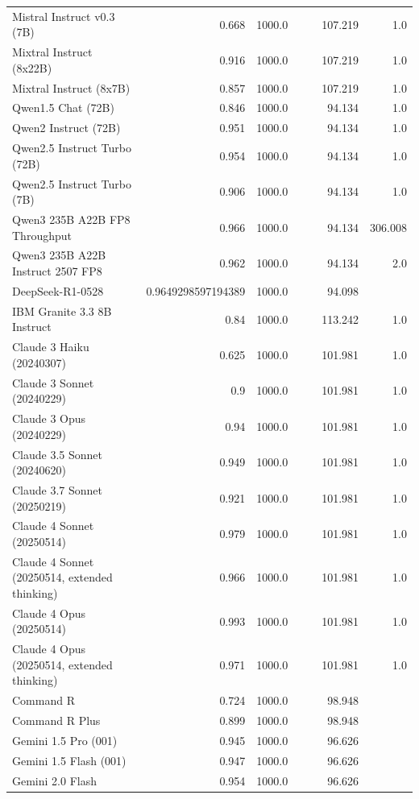 \begin{table}[htp]
{\begin{tabular}{lrrrrrr}
Mistral Instruct v0.3 (7B) & 0.668 & 1000.0 &  &  & 107.219 & 1.0 \\
Mixtral Instruct (8x22B) & 0.916 & 1000.0 &  &  & 107.219 & 1.0 \\
Mixtral Instruct (8x7B) & 0.857 & 1000.0 &  &  & 107.219 & 1.0 \\
Qwen1.5 Chat (72B) & 0.846 & 1000.0 &  &  & 94.134 & 1.0 \\
Qwen2 Instruct (72B) & 0.951 & 1000.0 &  &  & 94.134 & 1.0 \\
Qwen2.5 Instruct Turbo (72B) & 0.954 & 1000.0 &  &  & 94.134 & 1.0 \\
Qwen2.5 Instruct Turbo (7B) & 0.906 & 1000.0 &  &  & 94.134 & 1.0 \\
Qwen3 235B A22B FP8 Throughput & 0.966 & 1000.0 &  &  & 94.134 & 306.008 \\
Qwen3 235B A22B Instruct 2507 FP8 & 0.962 & 1000.0 &  &  & 94.134 & 2.0 \\
DeepSeek-R1-0528 & 0.9649298597194389 & 1000.0 &  &  & 94.098 &  \\
IBM Granite 3.3 8B Instruct & 0.84 & 1000.0 &  &  & 113.242 & 1.0 \\
Claude 3 Haiku (20240307) & 0.625 & 1000.0 &  &  & 101.981 & 1.0 \\
Claude 3 Sonnet (20240229) & 0.9 & 1000.0 &  &  & 101.981 & 1.0 \\
Claude 3 Opus (20240229) & 0.94 & 1000.0 &  &  & 101.981 & 1.0 \\
Claude 3.5 Sonnet (20240620) & 0.949 & 1000.0 &  &  & 101.981 & 1.0 \\
Claude 3.7 Sonnet (20250219) & 0.921 & 1000.0 &  &  & 101.981 & 1.0 \\
Claude 4 Sonnet (20250514) & 0.979 & 1000.0 &  &  & 101.981 & 1.0 \\
Claude 4 Sonnet (20250514, extended thinking) & 0.966 & 1000.0 &  &  & 101.981 & 1.0 \\
Claude 4 Opus (20250514) & 0.993 & 1000.0 &  &  & 101.981 & 1.0 \\
Claude 4 Opus (20250514, extended thinking) & 0.971 & 1000.0 &  &  & 101.981 & 1.0 \\
Command R & 0.724 & 1000.0 &  &  & 98.948 &  \\
Command R Plus & 0.899 & 1000.0 &  &  & 98.948 &  \\
Gemini 1.5 Pro (001) & 0.945 & 1000.0 &  &  & 96.626 &  \\
Gemini 1.5 Flash (001) & 0.947 & 1000.0 &  &  & 96.626 &  \\
Gemini 2.0 Flash & 0.954 & 1000.0 &  &  & 96.626 &  \\

\end{tabular}}
\end{table}
